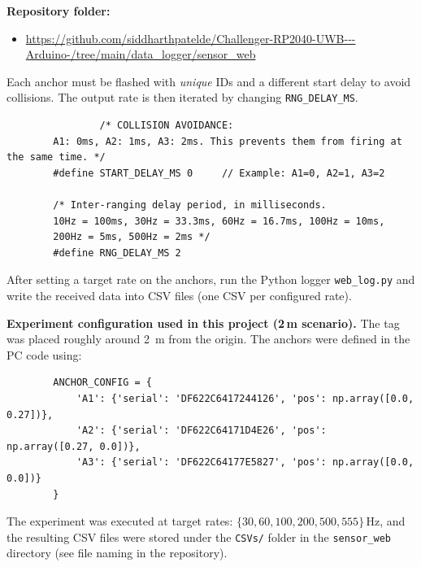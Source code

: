 \documentclass[a4paper,11pt]{article}
\begin{document}
\begin{tcolorbox}[title=Step 1: Configure each anchor (IDs + collision avoidance + target rate),
	colback=accentlight!60!white,
	sharp corners]
	
	\textbf{Repository folder:}
	\begin{itemize}
		\item \url{https://github.com/siddharthpatelde/Challenger-RP2040-UWB---Arduino-/tree/main/data_logger/sensor_web}
	\end{itemize}
	
	Each anchor must be flashed with \emph{unique} IDs and a different start delay to
	avoid collisions. The output rate is then iterated by changing \texttt{RNG\_DELAY\_MS}.
	
	\begin{verbatim}
				/* COLLISION AVOIDANCE:
		A1: 0ms, A2: 1ms, A3: 2ms. This prevents them from firing at the same time. */
		#define START_DELAY_MS 0     // Example: A1=0, A2=1, A3=2
		
		/* Inter-ranging delay period, in milliseconds.
		10Hz = 100ms, 30Hz = 33.3ms, 60Hz = 16.7ms, 100Hz = 10ms,
		200Hz = 5ms, 500Hz = 2ms */
		#define RNG_DELAY_MS 2
	\end{verbatim}
		
\end{tcolorbox}


\begin{tcolorbox}[title=Step 2: Log the data on the PC,
	colback=accentlight!60!white,
	sharp corners]
	After setting a target rate on the anchors, run the Python logger
	\texttt{web\_log.py} and write the received data into CSV files
	(one CSV per configured rate).
	
	\medskip
	\textbf{Experiment configuration used in this project (2\,m scenario).}
	The tag was placed roughly around \SI{2}{m} from the origin. The anchors were
	defined in the PC code using:
	
	\begin{verbatim}
		ANCHOR_CONFIG = {
			'A1': {'serial': 'DF622C6417244126', 'pos': np.array([0.0, 0.27])},
			'A2': {'serial': 'DF622C64171D4E26', 'pos': np.array([0.27, 0.0])},
			'A3': {'serial': 'DF622C64177E5827', 'pos': np.array([0.0, 0.0])}
		}
	\end{verbatim}
	
	The experiment was executed at target rates:
	\(\{30, 60, 100, 200, 500, 555\}\,\text{Hz}\),
	and the resulting CSV files were stored under the \texttt{CSVs/} folder in the
	\texttt{sensor\_web} directory (see file naming in the repository).
	
\end{tcolorbox}
\end{document}
